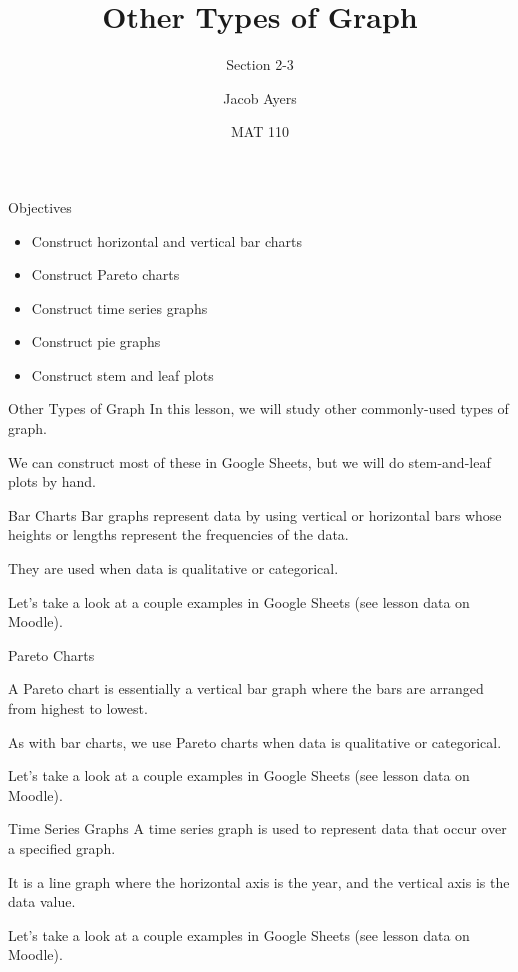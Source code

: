 \documentclass[t, aspectratio=169]{beamer}
\title[2-3]{Other Types of Graph}
\subtitle{Section 2-3}
\author{Jacob Ayers}
\institute{Lesson \#4}
\date{MAT 110}
\newcommand{\?}{\stackrel{?}{=}}
\begin{document}
	
	\begin{frame}
		\titlepage
	\end{frame}
	
	\begin{frame}{Objectives}
		\begin{itemize}
			\item Construct horizontal and vertical bar charts
			\item Construct Pareto charts
			\item Construct time series graphs
			\item Construct pie graphs
			\item Construct stem and leaf plots
		\end{itemize}
	\end{frame}

	\begin{frame}{Other Types of Graph}
		In this lesson, we will study other commonly-used types of graph.
		
		We can construct most of these in Google Sheets, but we will do stem-and-leaf plots by hand.
	\end{frame}

	\begin{frame}{Bar Charts}
		Bar graphs represent data by using vertical or horizontal bars whose heights or lengths represent the frequencies of the data. \pause
		
		They are used when data is qualitative or categorical. \pause
		
		Let's take a look at a couple examples in Google Sheets (see lesson data on Moodle).
	\end{frame}

	\begin{frame}{Pareto Charts}
		
		A Pareto chart is essentially a vertical bar graph where the bars are arranged from highest to lowest. \pause
		
		As with bar charts, we use Pareto charts when data is qualitative or categorical. \pause
		
		Let's take a look at a couple examples in Google Sheets (see lesson data on Moodle).
	\end{frame}

	\begin{frame}{Time Series Graphs}
		A time series graph is used to represent data that occur over a specified graph. \pause
		
		It is a line graph where the horizontal axis is the year, and the vertical axis is the data value. \pause
		
		Let's take a look at a couple examples in Google Sheets (see lesson data on Moodle).
	\end{frame}
\end{document}

